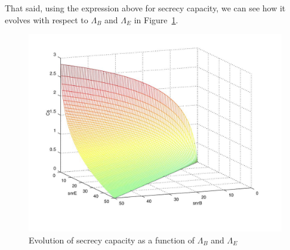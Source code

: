 \documentclass[a4paper,12pt,titlepage]{article}
\begin{document}
That said, using the expression above for secrecy capacity, we can see how it
evolves with respect to $\Lambda_B$ and $\Lambda_E$ in
Figure~\ref{fig:awgn_mesh_cs}.

\begin{figure}[p]
  \centering
  \includegraphics[scale=0.8]{awgn_mesh_cs.jpg}
  \caption{Evolution of secrecy capacity as a function of
  $\Lambda_B$ and $\Lambda_E$}
  \label{fig:awgn_mesh_cs}
\end{figure}
\end{document}
